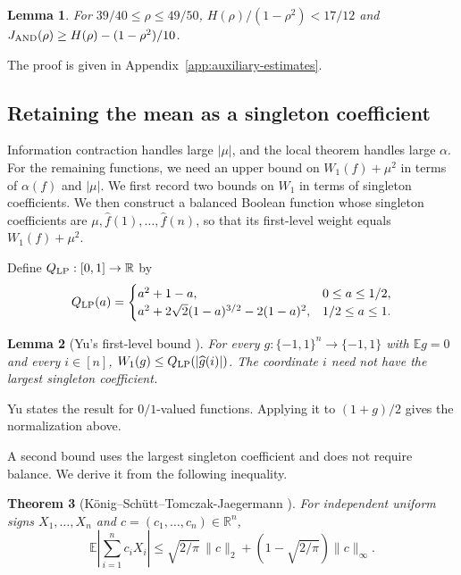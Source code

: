 \documentclass[11pt,letterpaper]{amsart}
\newcommand{\E}{\mathbb E}
\newcommand{\R}{\mathbb R}
\newcommand{\1}{\mathbf 1}
\newtheorem{theorem}{Theorem}[section]
\newtheorem{lemma}[theorem]{Lemma}
\numberwithin{equation}{section}
\begin{document}
\begin{lemma}\label{lem:and-rational}
For $39/40\le\rho\le49/50$,
$H(\rho)/(1-\rho^2)<17/12$ and
$J_{\rm AND}(\rho)\ge H(\rho)-(1-\rho^2)/10$.
\end{lemma}
The proof is given in Appendix~\ref{app:auxiliary-estimates}.

\subsection{Retaining the mean as a singleton coefficient}

Information contraction handles large $|\mu|$, and the local theorem handles large $\alpha$. For the remaining functions, we need an upper bound on $W_1(f)+\mu^2$ in terms of $\alpha(f)$ and $|\mu|$.
We first record two bounds on $W_1$ in terms of singleton
coefficients. We then construct a balanced Boolean function whose
singleton coefficients are $\mu,\widehat f(1),\ldots,\widehat f(n)$,
so that its first-level weight equals $W_1(f)+\mu^2$.

Define $Q_{\rm LP}:[0,1]\to\R$ by
\begin{equation}\label{eq:yu-fourier-cap}
 Q_{\rm LP}(a)=
 \begin{cases}
 a^2+1-a,&0\le a\le1/2,\\
 a^2+2\sqrt2(1-a)^{3/2}-2(1-a)^2,&1/2\le a\le1.
 \end{cases}
\end{equation}

\begin{lemma}[Yu's first-level bound
{\cite[Proposition~2 and Remark~2]{Yu2023}}]\label{ext:yu-bound}
For every $g:\{-1,1\}^n\to\{-1,1\}$ with $\E g=0$ and
every $i\in[n]$, $W_1(g)\le Q_{\rm LP}(|\widehat g(i)|)$.
The coordinate $i$ need not have the largest singleton coefficient.
\end{lemma}
Yu states the result for $0/1$-valued functions.
Applying it to $(1+g)/2$ gives the normalization above.

A second bound uses the largest singleton coefficient and
does not require balance. We derive it from the following inequality.

\begin{theorem}[K\"onig--Sch\"utt--Tomczak-Jaegermann
{\cite[Theorem~2]{KonigSchuttTomczak1999}}]
For independent uniform signs $X_1,\ldots,X_n$ and
$c=(c_1,\ldots,c_n)\in\R^n$,
\[
 \E\left|\sum_{i=1}^n c_iX_i\right|
 \le\sqrt{2/\pi}\,\|c\|_2
       +(1-\sqrt{2/\pi})\|c\|_\infty.
\]
\end{theorem}
\end{document}
